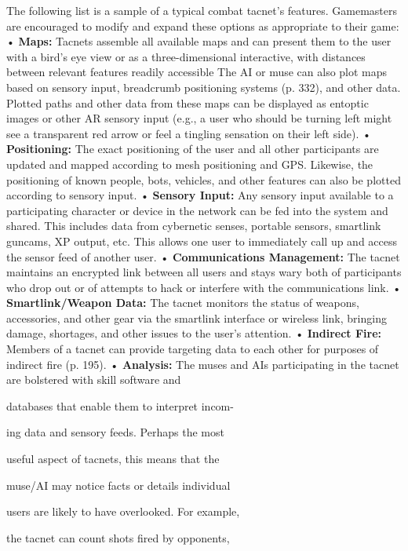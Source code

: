 The following list is a sample of a typical combat tacnet's 
features. Gamemasters are encouraged to modify and 
expand these options as appropriate to their game:
•  \textbf{Maps:} Tacnets assemble all available maps and 
can present them to the user with a bird's eye 
view or as a three-dimensional interactive, with 
distances between relevant features readily accessible
The AI or muse can also plot maps based
on sensory input, breadcrumb positioning systems
(p. 332), and other data. Plotted paths and
other data from these maps can be displayed as 
entoptic images or other AR sensory input (e.g., 
a user who should be turning left might see a 
transparent red arrow or feel a tingling sensation 
on their left side).
•  \textbf{Positioning:} The exact positioning of the user and 
all other participants are updated and mapped 
according to mesh positioning and GPS. Likewise, 
the positioning of known people, bots, vehicles, 
and other features can also be plotted according 
to sensory input.
•  \textbf{Sensory Input:} Any sensory input available to a 
participating character or device in the network 
can be fed into the system and shared. This 
includes data from cybernetic senses, portable 
sensors, smartlink guncams, XP output, etc. This 
allows one user to immediately call up and access 
the sensor feed of another user.
•  \textbf{Communications Management:} The tacnet 
maintains an encrypted link between all users 
and stays wary both of participants who drop 
out or of attempts to hack or interfere with the 
communications link.
•  \textbf{Smartlink/Weapon Data:} The tacnet monitors the 
status of weapons, accessories, and other gear via 
the smartlink interface or wireless link, bringing 
damage, shortages, and other issues to the user's 
attention.
•  \textbf{Indirect Fire:} Members of a tacnet can provide 
targeting data to each other for purposes of indirect
fire (p. 195).
•  \textbf{Analysis:} The muses and AIs participating in 
the tacnet are bolstered with skill software and 

databases that enable them to interpret incom-

ing data and sensory feeds. Perhaps the most 

useful aspect of tacnets, this means that the 

muse/AI may notice facts or details individual 

users are likely to have overlooked. For example, 

the tacnet can count shots fired by opponents, 

